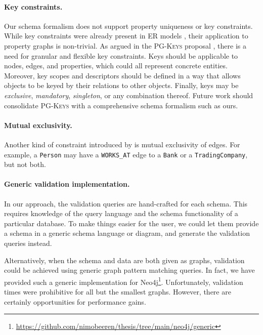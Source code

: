 \documentclass{report}
\theoremstyle{definition}
\begin{document}


\paragraph{Key constraints.} Our schema formalism does not support property uniqueness or key constraints. While key constraints were already present in ER models \citep{chen1976entity}, their application to property graphs is non-trivial. As argued in the \textsc{PG-Keys} proposal \citep{angles2021keys}, there is a need for granular and flexible key constraints. Keys should be applicable to nodes, edges, and properties, which could all represent concrete entities. Moreover, key scopes and descriptors should be defined in a way that allows objects to be keyed by their relations to other objects. Finally, keys may be \emph{exclusive}, \emph{mandatory}, \emph{singleton}, or any combination thereof. Future work should consolidate \textsc{PG-Keys} with a comprehensive schema formalism such as ours.

\paragraph{Mutual exclusivity.} Another kind of constraint introduced by \citet{barker1990entity} is mutual exclusivity of edges. For example, a \texttt{Person} may have a \texttt{WORKS\_AT} edge to a \texttt{Bank} or a \texttt{TradingCompany}, but not both.

\paragraph{Generic validation implementation.} In our approach, the validation queries are hand-crafted for each schema. This requires knowledge of the query language and the schema functionality of a particular database. To make things easier for the user, we could let them provide a schema in a generic schema language or diagram, and generate the validation queries instead.

Alternatively, when the schema and data are both given as graphs, validation could be achieved using generic graph pattern matching queries. In fact, we have provided such a generic implementation for Neo4j\footnote{\url{https://github.com/nimobeeren/thesis/tree/main/neo4j/generic}}. Unfortunately, validation times were prohibitive for all but the smallest graphs. However, there are certainly opportunities for performance gains.
\end{document}
